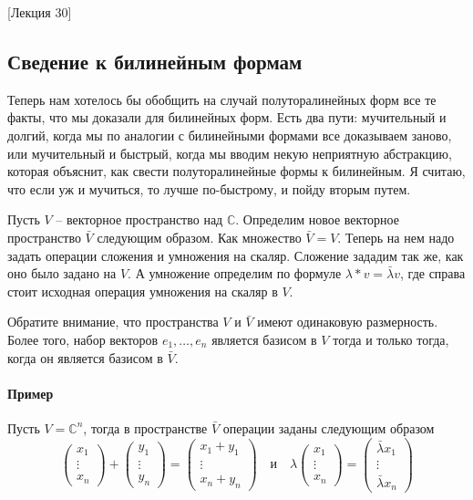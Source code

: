 [Лекция 30]


\subsection{Сведение к билинейным формам}

Теперь нам хотелось бы обобщить на случай полуторалинейных форм все те факты, что мы доказали для билинейных форм.
Есть два пути: мучительный и долгий, когда мы по аналогии с билинейными формами все доказываем заново, или мучительный и быстрый, когда мы вводим некую неприятную абстракцию, которая объяснит, как свести полуторалинейные формы к билинейным.
Я считаю, что если уж и мучиться, то лучше по-быстрому, и пойду вторым путем.

\begin{definition}
Пусть $V$ -- векторное пространство над $\mathbb C$.
Определим новое векторное пространство $\bar V$ следующим образом.
Как множество $\bar V = V$.
Теперь на нем надо задать операции сложения и умножения на скаляр.
Сложение зададим так же, как оно было задано на $V$.
А умножение определим по формуле $\lambda *v = \bar \lambda v$, где справа стоит исходная операция умножения на скаляр в $V$.
\end{definition}

Обратите внимание, что пространства $V$ и $\bar V$ имеют одинаковую размерность.
Более того, набор векторов $e_1,\ldots,e_n$ является базисом в $V$ тогда и только тогда, когда он является базисом в $\bar V$.

\paragraph{Пример}

Пусть $V = \mathbb C^n$, тогда в пространстве $\bar V$ операции заданы следующим образом
\[
\begin{pmatrix}
{x_1}\\{\vdots}\\{x_n}
\end{pmatrix}
+
\begin{pmatrix}
{y_1}\\{\vdots}\\{y_n}
\end{pmatrix}
=
\begin{pmatrix}
{x_1 + y_1}\\{\vdots}\\{x_n + y_n}
\end{pmatrix}
\quad\text{и}\quad
\lambda
\begin{pmatrix}
{x_1}\\{\vdots}\\{x_n}
\end{pmatrix}
=
\begin{pmatrix}
{\bar \lambda x_1}\\{\vdots}\\{\bar \lambda x_n}
\end{pmatrix}
\]

